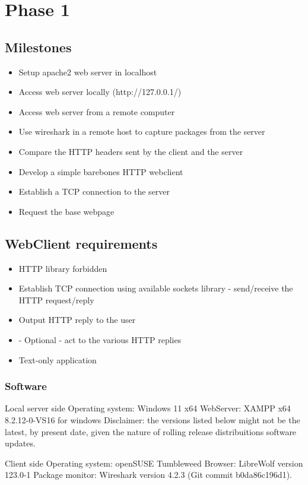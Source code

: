 \documentclass[11pt,a4paper]{report}
\begin{document}
\chapter{Phase 1}
    \section{Milestones}
        \begin{itemize}
            \item Setup apache2 web server in localhost
            \item Access web server locally (http://127.0.0.1/)
            \item Access web server from a remote computer
            \item Use wireshark in a remote host to capture packages from the server
            \item Compare the HTTP headers sent by the client and the server
            \item Develop a simple barebones HTTP webclient
            \item Establish a TCP connection to the server
            \item Request the base webpage
        \end{itemize}
        
    \section{WebClient requirements}
        \begin{itemize}
            \item HTTP library forbidden
            \item Establish TCP connection using available sockets library - send/receive the HTTP request/reply
            \item Output HTTP reply to the user
            \item - Optional - act to the various HTTP replies
            \item Text-only application
        \end{itemize}

    \subsection{Software}
        \item Local server side
            \subitem Operating system: Windows 11 x64
            \subitem WebServer: XAMPP x64 8.2.12-0-VS16 for windows
        Disclaimer: the versions listed below might not be the latest, by present date, given the nature of rolling release distribuitions software updates.
        \item Client side
            \subitem Operating system: openSUSE Tumbleweed
            \subitem Browser: LibreWolf version 123.0-1
            \subitem Package monitor: Wireshark version 4.2.3 (Git commit b0da86c196d1).
    
\end{document}
